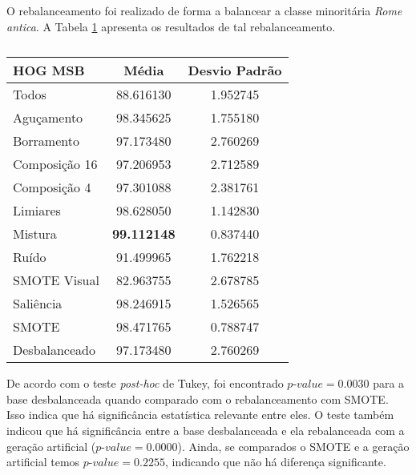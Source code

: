 
O rebalanceamento foi realizado de forma a balancear a classe minoritária \textit{Rome antica}. A Tabela \ref{tab:resultados:4.1} apresenta os resultados de tal rebalanceamento.

\begin{table}[H]
\begin{center}
\caption{}
\label{tab:resultados:4.1}
\begin{tabular}{|l|c|c|}
\hline
\textbf{HOG MSB} & \textbf{Média}     & \textbf{Desvio Padrão} \\ \hline
   Todos        &  88.616130 &  1.952745  \\ \hline
  Aguçamento    &  98.345625 &  1.755180  \\ \hline
  Borramento    &  97.173480 &  2.760269  \\ \hline
  Composição 16 &  97.206953 &  2.712589  \\ \hline
  Composição 4  &  97.301088 &  2.381761  \\ \hline
  Limiares      &  98.628050 &  1.142830  \\ \hline
  Mistura       &  \textbf{99.112148} &  0.837440  \\ \hline
  Ruído         &  91.499965 &  1.762218  \\ \hline
  SMOTE Visual  &  82.963755 &  2.678785  \\ \hline
  Saliência     &  98.246915 &  1.526565  \\ \hline
 SMOTE          &  98.471765 &  0.788747  \\ \hline
Desbalanceado   &  97.173480 &  2.760269  \\ \hline
\end{tabular}
\end{center}
\end{table}



De acordo com o teste \textit{post-hoc} de Tukey, foi encontrado $\textit{p-value} = 0.0030$ para a base desbalanceada quando comparado com o rebalanceamento com SMOTE. Isso indica que há significância estatística relevante entre eles. O teste também indicou que há significância entre a base desbalanceada e ela rebalanceada com a geração artificial ($\textit{p-value} = 0.0000$). Ainda, se comparados o SMOTE e a geração artificial temos $\textit{p-value} = 0.2255$, indicando que não há diferença significante.



